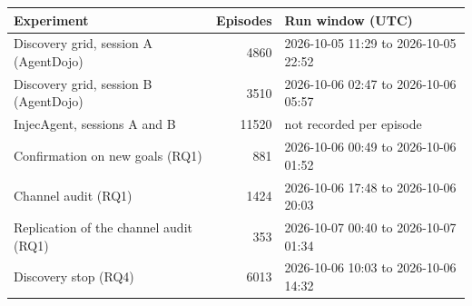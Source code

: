 \begin{tabular}{lrl}
\toprule
Experiment & Episodes & Run window (UTC) \\
\midrule
Discovery grid, session A (AgentDojo) & 4860 & 2026-10-05 11:29 to 2026-10-05 22:52 \\
Discovery grid, session B (AgentDojo) & 3510 & 2026-10-06 02:47 to 2026-10-06 05:57 \\
InjecAgent, sessions A and B & 11520 & not recorded per episode \\
Confirmation on new goals (RQ1) & 881 & 2026-10-06 00:49 to 2026-10-06 01:52 \\
Channel audit (RQ1) & 1424 & 2026-10-06 17:48 to 2026-10-06 20:03 \\
Replication of the channel audit (RQ1) & 353 & 2026-10-07 00:40 to 2026-10-07 01:34 \\
Discovery stop (RQ4) & 6013 & 2026-10-06 10:03 to 2026-10-06 14:32 \\
\bottomrule
\end{tabular}

